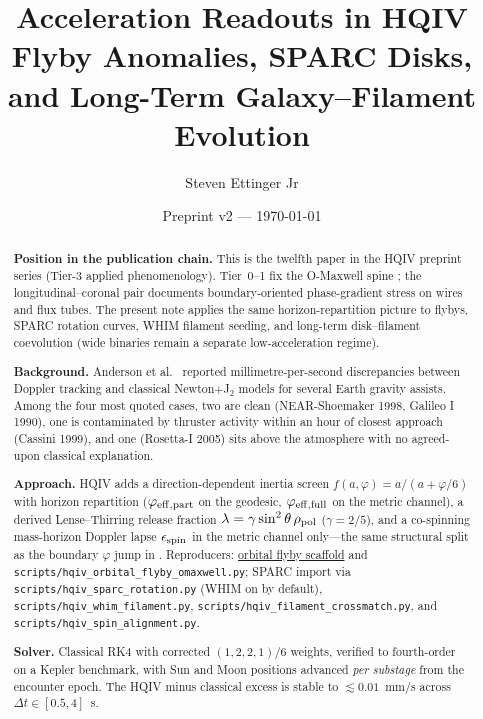\documentclass[11pt]{amsart}
\title[HQIV Accelerations]{Acceleration Readouts in HQIV\\
\large Flyby Anomalies, SPARC Disks, and Long-Term Galaxy--Filament Evolution}
\author{Steven Ettinger Jr}
\date{Preprint v2 --- \today}
\begin{document}
\begin{abstract}
\noindent\textbf{Position in the publication chain.}
This is the twelfth paper in the HQIV preprint series (Tier-3 applied phenomenology).
Tier~0--1 fix the O-Maxwell spine
\cite{ettinger2026hqiv,hqiv-lightcone-paper,hqiv-so8-paper,hqiv-3d-growth-paper,hqiv-oct-action-paper,hqiv-kirchhoff-paper};
the longitudinal--coronal pair
\cite{ettinger2026longitudinal,hqiv-coronal-paper} documents boundary-oriented
phase-gradient stress on wires and flux tubes. The present note applies the same
horizon-repartition picture to flybys, SPARC rotation curves, WHIM filament seeding,
and long-term disk--filament coevolution (wide binaries remain a separate low-acceleration
regime).

\noindent\textbf{Background.}
Anderson et al.\ \cite{anderson2008} reported millimetre-per-second discrepancies between
Doppler tracking and classical Newton$+$J$_2$ models for several Earth gravity assists.
Among the four most quoted cases, two are clean (NEAR-Shoemaker 1998, Galileo I 1990), one is
contaminated by thruster activity within an hour of closest approach (Cassini 1999), and one
(Rosetta-I 2005) sits above the atmosphere with no agreed-upon classical explanation.

\noindent\textbf{Approach.}
HQIV adds a direction-dependent inertia screen $f(a,\varphi)=a/(a+\varphi/6)$ with horizon
repartition ($\varphi_{\rm eff,part}$ on the geodesic, $\varphi_{\rm eff,full}$ on the
metric channel), a derived Lense--Thirring release fraction
$\lambda=\gamma\sin^2\theta\,\rho_{\rm pol}$ ($\gamma=2/5$), and a co-spinning mass-horizon
Doppler lapse $\epsilon_{\rm spin}$ in the metric channel only---the same structural split
as the boundary $\varphi$ jump in \cite{hqiv-coronal-paper}. Reproducers:
\hyperref[lean:orbital-scaffold]{orbital flyby scaffold} and
\texttt{scripts/hqiv\_orbital\_flyby\_omaxwell.py}; SPARC import via
\texttt{scripts/hqiv\_sparc\_rotation.py} (WHIM on by default),
\texttt{scripts/hqiv\_whim\_filament.py},
\texttt{scripts/hqiv\_filament\_crossmatch.py}, and
\texttt{scripts/hqiv\_spin\_alignment.py}.

\noindent\textbf{Solver.}
Classical RK4 with corrected $(1,2,2,1)/6$ weights, verified to fourth-order on a Kepler
benchmark, with Sun and Moon positions advanced \emph{per substage} from the encounter
epoch. The HQIV minus classical excess is stable to $\lesssim 0.01$~mm/s across
$\Delta t\in[0.5,4]$~s.


\end{abstract}
\end{document}
